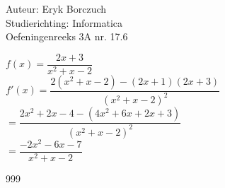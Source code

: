 \documentclass[a4paper]{article}
\begin{document}
  
\noindent \large Auteur: Eryk Borczuch \\
\noindent \large Studierichting: Informatica\\
\noindent \large Oefeningenreeks 3A nr. 17.6\\

\medskip

\normalsize

$f(x) = \dfrac{2x+3}{x^2+x-2}$\\

$f'(x) = \dfrac{2(x^2+x-2)-(2x+1)(2x+3)}{(x^2+x-2)^2}$\\

$= \dfrac{2x^2+2x-4-(4x^2+6x+2x+3)}{(x^2+x-2)^2}$\\

$= \dfrac{-2x^2-6x-7}{x^2+x-2}$\\

\begin{thebibliography}{999}
\end{thebibliography}
\end{document}
